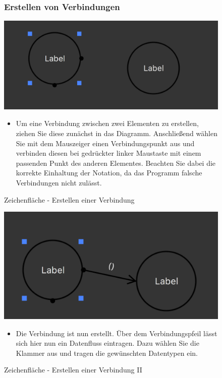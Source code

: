 \begin{figure}[h!]
\subsubsection{Erstellen von Verbindungen}
	\centering
	\includegraphics[width=.4\textwidth]{Zeichenflaeche_Basics.png}
	\caption{Zeichenfläche - Erstellen einer Verbindung}	
\begin{itemize}	
\item Um eine Verbindung zwischen zwei Elementen zu erstellen, ziehen Sie diese zunächst in das Diagramm. Anschließend wählen Sie mit dem Mauszeiger einen Verbindungspunkt aus und verbinden diesen bei gedrückter linker Maustaste mit einem passenden Punkt des anderen Elementes. Beachten Sie dabei die korrekte Einhaltung der Notation, da das Programm falsche Verbindungen nicht zulässt. 
\end{itemize}
\end{figure}

\begin{figure}[h!]
	\centering
	\includegraphics[width=.4\textwidth]{Zeichenflaeche_Basics2.png}
	\caption{Zeichenfläche - Erstellen einer Verbindung II}	
\begin{itemize}	
\item Die Verbindung ist nun erstellt. Über dem Verbindungspfeil lässt sich hier nun ein Datenfluss eintragen. Dazu wählen Sie die Klammer aus und tragen die gewünschten Datentypen ein. 
\end{itemize}
\end{figure}

